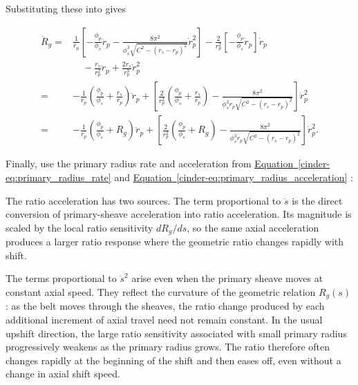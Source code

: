 \documentclass[11pt]{report}
\newcommand{\FormEq}[1]{%
    \hyperref[cinder-#1]{Equation~\ref*{cinder-#1}}%
  }
\newcommand{\FormEq}[1]{\textit{main formulation equation \nolinkurl{#1}}}
\begin{document}
Substituting these into  gives

\begin{align}
\ddot R_g
={}&
\frac{1}{r_p}
\left[
-\frac{\phi_p}{\phi_s}\ddot r_p
-
\frac{8\pi^2}
{\phi_s^3\sqrt{C^2-(r_s-r_p)^2}}
\dot r_p^2
\right]
-
\frac{2}{r_p^2}
\left[
-\frac{\phi_p}{\phi_s}\dot r_p
\right]
\dot r_p
\nonumber\\
&\quad
-
\frac{r_s}{r_p^2}\ddot r_p
+
\frac{2r_s}{r_p^3}\dot r_p^2
\nonumber\\
={}&
-\frac{1}{r_p}
\left(
\frac{\phi_p}{\phi_s}
+
\frac{r_s}{r_p}
\right)
\ddot r_p
+
\left[
\frac{2}{r_p^2}
\left(
\frac{\phi_p}{\phi_s}
+
\frac{r_s}{r_p}
\right)
-
\frac{8\pi^2}
{\phi_s^3r_p\sqrt{C^2-(r_s-r_p)^2}}
\right]
\dot r_p^2
\nonumber\\
={}&
-\frac{1}{r_p}
\left(
\frac{\phi_p}{\phi_s}
+
R_g
\right)
\ddot r_p
+
\left[
\frac{2}{r_p^2}
\left(
\frac{\phi_p}{\phi_s}
+
R_g
\right)
-
\frac{8\pi^2}
{\phi_s^3r_p\sqrt{C^2-(r_s-r_p)^2}}
\right]
\dot r_p^2.
\label{eq:geometric_ratio_acceleration_primary_form}
\end{align}

Finally, use the primary radius rate and acceleration from
\FormEq{eq:primary_radius_rate} and \FormEq{eq:primary_radius_acceleration}:


The ratio acceleration has two sources. The term proportional to \(\ddot s\)
is the direct conversion of primary-sheave acceleration into ratio
acceleration. Its magnitude is scaled by the local ratio sensitivity
\(dR_g/ds\), so the same axial acceleration produces a larger ratio response
where the geometric ratio changes rapidly with shift.

The terms proportional to \(\dot s^2\) arise even when the primary sheave moves
at constant axial speed. They reflect the curvature of the geometric relation
\(R_g(s)\): as the belt moves through the sheaves, the ratio change produced by
each additional increment of axial travel need not remain constant. In the
usual upshift direction, the large ratio sensitivity associated with small
primary radius progressively weakens as the primary radius grows. The ratio
therefore often changes rapidly at the beginning of the shift and then eases
off, even without a change in axial shift speed.





\end{document}
